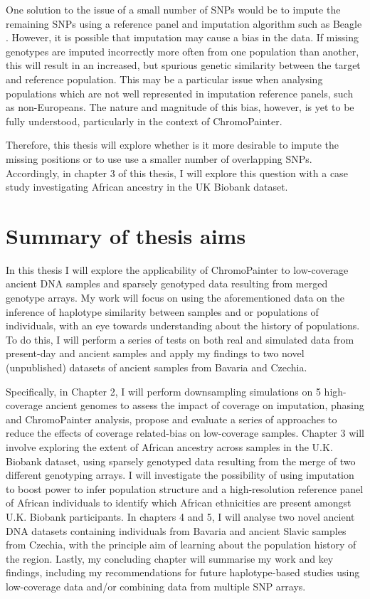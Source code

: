 One solution to the issue of a small number of SNPs would be to impute the remaining SNPs using a reference panel and imputation algorithm such as Beagle \cite{Browning2016}. However, it is possible that imputation may cause a bias in the data. If missing genotypes are imputed incorrectly more often from one population than another, this will result in an increased, but spurious genetic similarity between the target and reference population. This may be a particular issue when analysing populations which are not well represented in imputation reference panels, such as non-Europeans. The nature and magnitude of this bias, however, is yet to be fully understood, particularly in the context of ChromoPainter.  

Therefore, this thesis will explore whether is it more desirable to impute the missing positions or to use use a smaller number of overlapping SNPs. Accordingly, in chapter 3 of this thesis, I will explore this question with a case study investigating African ancestry in the UK Biobank dataset. 
 
\section{Summary of thesis aims}

In this thesis I will explore the applicability of ChromoPainter to low-coverage ancient DNA samples and sparsely genotyped data resulting from merged genotype arrays. My work will focus on using the aforementioned data on the inference of haplotype similarity between samples and or populations of individuals, with an eye towards understanding about the history of populations. To do this, I will perform a series of tests on both real and simulated data from present-day and ancient samples and apply my findings to two novel (unpublished) datasets of ancient samples from Bavaria and Czechia. 

Specifically, in Chapter 2, I will perform downsampling simulations on 5 high-coverage ancient genomes to assess the impact of coverage on imputation, phasing and ChromoPainter analysis, propose and evaluate a series of approaches to reduce the effects of coverage related-bias on low-coverage samples. Chapter 3 will involve exploring the extent of African ancestry across samples in the U.K. Biobank dataset, using sparsely genotyped data resulting from the merge of two different genotyping arrays. I will investigate the possibility of using imputation to boost power to infer population structure and a high-resolution reference panel of African individuals to identify which African ethnicities are present amongst U.K. Biobank participants. In chapters 4 and 5, I will analyse two novel ancient DNA datasets containing individuals from Bavaria and ancient Slavic samples from Czechia, with the principle aim of learning about the population history of the region. Lastly, my concluding chapter will summarise my work and key findings, including my recommendations for future haplotype-based studies using low-coverage data and/or combining data from multiple SNP arrays.




